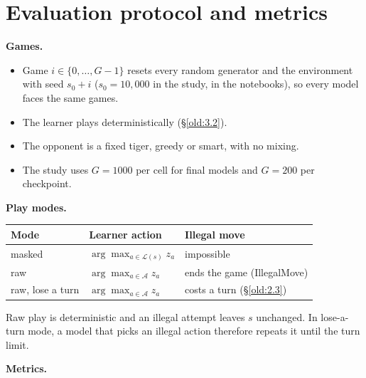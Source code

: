 \section{Evaluation protocol and metrics}\label{old:7}

\textbf{Games.}

\begin{itemize}
\item Game $i \in \{0, \dots, G-1\}$ resets every random generator and the environment with seed $s_0 + i$ ($s_0 = 10{,}000$ in the study,  in the notebooks), so every model faces the same games.
\item The learner plays deterministically (\S\ref{old:3.2}).
\item The opponent is a fixed tiger, greedy or smart, with no mixing.
\item The study uses $G = 1000$ per cell for final models and $G = 200$ per checkpoint.
\end{itemize}
\textbf{Play modes.}

{\small
\begin{longtable}{@{}lll@{}}
\toprule
\textbf{Mode} & \textbf{Learner action} & \textbf{Illegal move} \\
\midrule
\endhead
masked & $\arg\max_{a \in \mathcal{L}(s)} z_a$ & impossible \\
raw & $\arg\max_{a \in \mathcal{A}} z_a$ & ends the game (IllegalMove) \\
raw, lose a turn & $\arg\max_{a \in \mathcal{A}} z_a$ & costs a turn (\S\ref{old:2.3}) \\
\bottomrule
\end{longtable}\addtocounter{table}{-1}
}

Raw play is deterministic and an illegal attempt leaves $s$ unchanged. In lose-a-turn mode, a model that picks an illegal action therefore repeats it until the turn limit.

\textbf{Metrics.}

